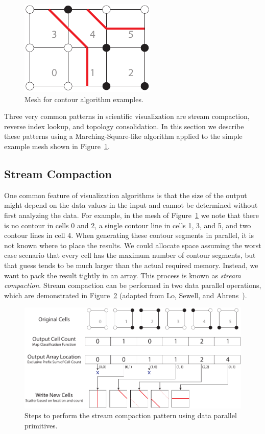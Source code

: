 \documentclass{superfri}
\newcommand*{\scite}[1]{~\cite{#1}}
\newcommand*{\keyterm}[1]{\emph{#1}}
\begin{document}
\begin{figure}
  \vspace{-\baselineskip}
  \includegraphics{images/ExampleMesh}
  \caption{Mesh for contour algorithm examples.}
  \label{fig:ExampleMesh}
  \vspace{-\baselineskip}
\end{figure}

Three very common patterns in scientific visualization are stream
compaction, reverse index lookup, and topology consolidation. In this
section we describe these patterns using a Marching-Square-like algorithm
applied to the simple example mesh shown in Figure~\ref{fig:ExampleMesh}.

\subsection{Stream Compaction}

\noindent
One common feature of visualization algorithms is that the size of the
output might depend on the data values in the input and cannot be
determined without first analyzing the data. For example, in the mesh of
Figure~\ref{fig:ExampleMesh} we note that there is no contour in cells 0
and 2, a single contour line in cells 1, 3, and 5, and two contour lines in
cell 4. When generating these contour segments in parallel, it is not known
where to place the results. We could allocate space assuming the worst case
scenario that every cell has the maximum number of contour segments, but
that guess tends to be much larger than the actual required memory.
Instead, we want to pack the result tightly in an array. This process is
known as \keyterm{stream compaction}. Stream compaction can be performed in
two data parallel operations, which are demonstrated in
Figure~\ref{fig:StreamCompaction} (adapted from Lo, Sewell, and
Ahrens\scite{PISTON}).

\begin{figure}[htb]
  \centering
  \includegraphics[scale=.9]{images/StreamCompaction}
  \caption{Steps to perform the stream compaction pattern using data
    parallel primitives.}
  \label{fig:StreamCompaction}
\end{figure}
\end{document}
